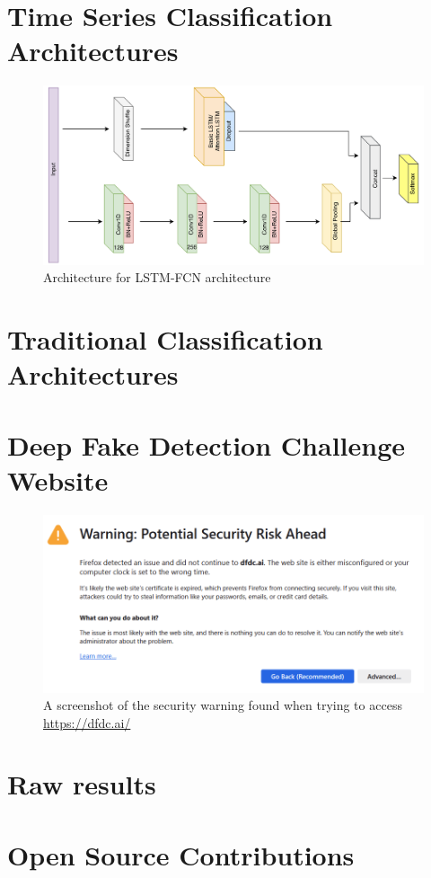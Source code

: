 \chapter{Time Series Classification Architectures}
\label{ch:series-architectures}

\begin{figure}[h]
    \centering
    \includegraphics[width=0.75\linewidth]{dissertation//figures/lstm-fcn.png}
    \caption{Architecture for LSTM-FCN architecture\cite{karim2017lstm}}
    \label{fig:lstm-fcn}
\end{figure}

\chapter{Traditional Classification Architectures}
\label{ch:trad-architectures}

\chapter{Deep Fake Detection Challenge Website}
\label{ch:dfdcai}

\begin{figure}[h]
    \centering
    \includegraphics[width=1\linewidth]{dissertation//figures/dfdc.png}
    \caption{A screenshot of the security warning found when trying to access \url{https://dfdc.ai/}}
    \label{fig:dfdcai}
\end{figure}

\chapter{Raw results}
\label{ch:raw-results}

\chapter{Open Source Contributions}